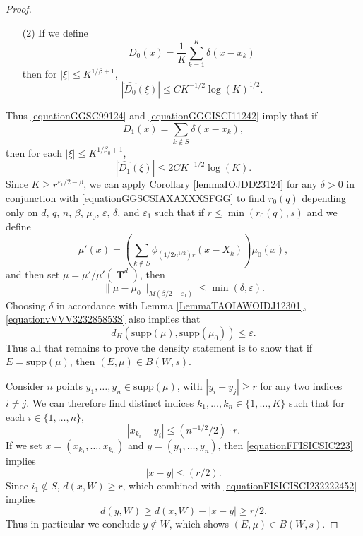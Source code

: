 \documentclass[12pt,reqno]{article}
\numberwithin{equation}{section}
\DeclareMathOperator{\TT}{\mathbf{T}}
\begin{document}
\begin{proof}
\begin{itemize}
        \item[(2)] If we define
        \[ D_0(x) = \frac{1}{K} \sum_{k = 1}^K \delta(x - x_k) \]
        then for $|\xi| \leq K^{1/\beta + 1}$,
        \begin{equation} \label{equationGGGISCI11242}
            |\widehat{D_0}(\xi)| \leq C K^{-1/2} \log(K)^{1/2}.
        \end{equation}
    \end{itemize}
    Thus \eqref{equationGGSC99124} and \eqref{equationGGGISCI11242} imply that if
    \[ D_1(x) = \sum_{k \not \in S} \delta(x - x_k), \]
    then for each $|\xi| \leq K^{1/\beta_0 + 1}$,
    \begin{equation} \label{equationGGSCSIAXAXXXSFGG}
        |\widehat{D_1}(\xi)| \leq 2C K^{-1/2} \log(K).
    \end{equation}
    Since $K \geq r^{\varepsilon_1/2 - \beta}$, we can apply Corollary \ref{lemmaIOJDD23124} for any $\delta > 0$ in conjunction with \eqref{equationGGSCSIAXAXXXSFGG} to find $r_0(q)$ depending only on $d$, $q$, $n$, $\beta$, $\mu_0$, $\varepsilon$, $\delta$, and $\varepsilon_1$ such that if $r \leq \min(r_0(q),s)$ and we define
    \[ \mu'(x) = \left( \sum_{k \not \in S} \phi_{(1/2n^{1/2}) r}(x - X_k) \right) \mu_0(x), \]
    and then set $\mu = \mu' / \mu'(\TT^d)$, then
    \begin{equation} \label{equationvVVV323285853S}
        \| \mu - \mu_0 \|_{M(\beta/2 - \varepsilon_1)} \leq \min(\delta,\varepsilon).
    \end{equation}
    Choosing $\delta$ in accordance with Lemma \ref{LemmaTAOIAWOIDJ12301}, \eqref{equationvVVV323285853S} also implies that
    \[ d_H(\text{supp}(\mu), \text{supp}(\mu_0)) \leq \varepsilon. \]
    Thus all that remains to prove the density statement is to show that if $E = \text{supp}(\mu)$, then $(E,\mu) \in B(W,s)$.

    Consider $n$ points $y_1, \dots, y_n \in \text{supp}(\mu)$, with $|y_i - y_j| \geq r$ for any two indices $i \neq j$. We can therefore find distinct indices $k_1, \dots, k_n \in \{ 1, \dots, K \}$ such that for each $i \in \{ 1, \dots, n \}$,
    \begin{equation} \label{equationFFISICSIC223}
        |x_{k_i} - y_i| \leq (n^{-1/2}/2) \cdot r.
    \end{equation}
    If we set $x = (x_{k_1}, \dots, x_{k_n})$ and $y = (y_1, \dots, y_n)$, then \eqref{equationFFISICSIC223} implies
    \begin{equation} \label{equationFISICISCI232222452}
        |x - y| \leq (r/2).
    \end{equation}
    Since $i_1 \not \in S$, $d(x,W) \geq r$, which combined with \eqref{equationFISICISCI232222452} implies
    \begin{equation} \label{equationSICSICI}
        d(y,W) \geq d(x,W) - |x - y| \geq r/2.
    \end{equation}
    Thus in particular we conclude $y \not \in W$, which shows $(E,\mu) \in B(W,s)$.
\end{proof}
\end{document}
